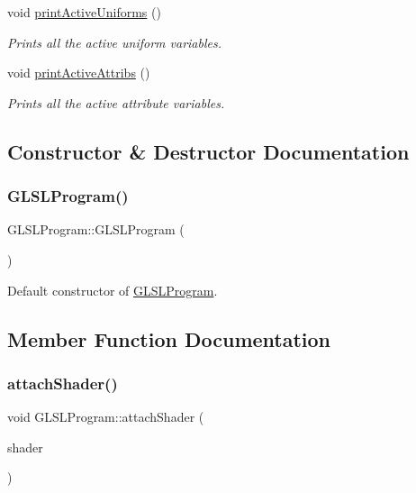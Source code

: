 \begin{DoxyCompactItemize}
void \hyperlink{class_g_l_s_l_program_a75e11d36a5b634c58a84caa96c9c38e4}{print\+Active\+Uniforms} ()
\begin{DoxyCompactList}\small\item\em Prints all the active uniform variables. \end{DoxyCompactList}\item 
void \hyperlink{class_g_l_s_l_program_aab7c8bc0e5d0b75a9eb0c60de3cda5b5}{print\+Active\+Attribs} ()
\begin{DoxyCompactList}\small\item\em Prints all the active attribute variables. \end{DoxyCompactList}\end{DoxyCompactItemize}


\subsection{Constructor \& Destructor Documentation}
\hypertarget{class_g_l_s_l_program_a9a93ab534634ee4abfda2f216008e553}{}\label{class_g_l_s_l_program_a9a93ab534634ee4abfda2f216008e553} 
\subsubsection{\texorpdfstring{G\+L\+S\+L\+Program()}{GLSLProgram()}}
{\footnotesize\ttfamily G\+L\+S\+L\+Program\+::\+G\+L\+S\+L\+Program (\begin{DoxyParamCaption}{ }\end{DoxyParamCaption})}



Default constructor of \hyperlink{class_g_l_s_l_program}{G\+L\+S\+L\+Program}. 



\subsection{Member Function Documentation}
\hypertarget{class_g_l_s_l_program_a4b09d65133e3d9495315c2db2fb9295d}{}\label{class_g_l_s_l_program_a4b09d65133e3d9495315c2db2fb9295d} 
\subsubsection{\texorpdfstring{attach\+Shader()}{attachShader()}}
{\footnotesize\ttfamily void G\+L\+S\+L\+Program\+::attach\+Shader (\begin{DoxyParamCaption}\item[{G\+Luint}]{shader }\end{DoxyParamCaption})}



